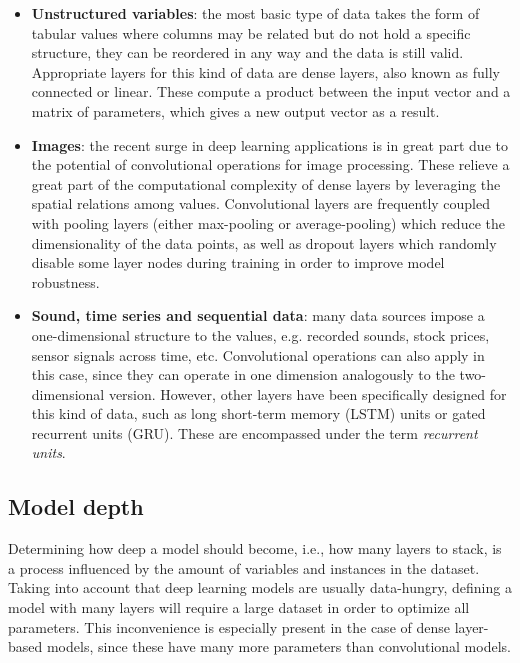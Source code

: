 \begin{itemize}
    \item \textbf{Unstructured variables}: the most basic type of data takes the form of tabular values where columns may be related but do not hold a specific structure, they can be reordered in any way and the data is still valid. Appropriate layers for this kind of data are dense layers, also known as fully connected or linear. These compute a product between the input vector and a matrix of parameters, which gives a new output vector as a result.
    \item \textbf{Images}: the recent surge in deep learning applications is in great part due to the potential of convolutional operations for image processing. These relieve a great part of the computational complexity of dense layers by leveraging the spatial relations among values. %
    Convolutional layers are frequently coupled with pooling layers (either max-pooling or average-pooling) which reduce the dimensionality of the data points, as well as dropout layers which randomly disable some layer nodes during training in order to improve model robustness.
    \item \textbf{Sound, time series and sequential data}: many data sources impose a one-dimensional structure to the values, e.g. recorded sounds, stock prices, sensor signals across time, etc. Convolutional operations can also apply in this case, since they can operate in one dimension analogously to the two-dimensional version. However, other layers have been specifically designed for this kind of data, such as long short-term memory (LSTM) units or gated recurrent units (GRU). These are encompassed under the term \textit{recurrent units}.
\end{itemize}

\subsection{Model depth}

Determining how deep a model should become, i.e., how many layers to stack, is a process influenced by the amount of variables and instances in the dataset. Taking into account that deep learning models are usually data-hungry, defining a model with many layers will require a large dataset in order to optimize all parameters. This inconvenience is especially present in the case of dense layer-based models, since these have many more parameters than convolutional models.


